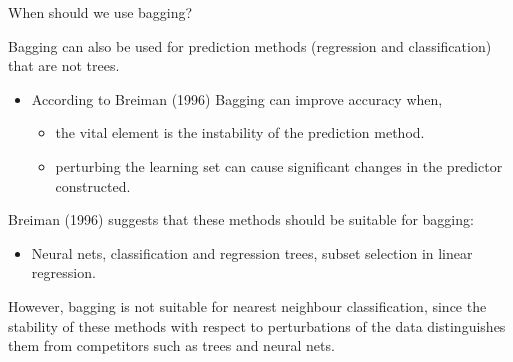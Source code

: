 \documentclass[10pt,ignorenonframetext,]{beamer}
\providecommand{\tightlist}{%
  \setlength{\itemsep}{0pt}\setlength{\parskip}{0pt}}
\begin{document}
\begin{frame}

\begin{block}{When should we use bagging?}

\vspace{2mm}

Bagging can also be used for prediction methods (regression and
classification) that are not trees.

\begin{itemize}
\item
  According to Breiman (1996) Bagging can improve accuracy when,

  \begin{itemize}
  \tightlist
  \item
    the vital element is the instability of the prediction method.
  \item
    perturbing the learning set can cause significant changes in the
    predictor constructed.
  \end{itemize}
\end{itemize}

\vspace{1mm}

Breiman (1996) suggests that these methods should be suitable for
bagging:

\begin{itemize}
\tightlist
\item
  Neural nets, classification and regression trees, subset selection in
  linear regression.
\end{itemize}

\vspace{1mm}

However, bagging is not suitable for nearest neighbour classification,
since the stability of these methods with respect to perturbations of
the data distinguishes them from competitors such as trees and neural
nets.

\end{block}

\end{frame}
\end{document}
